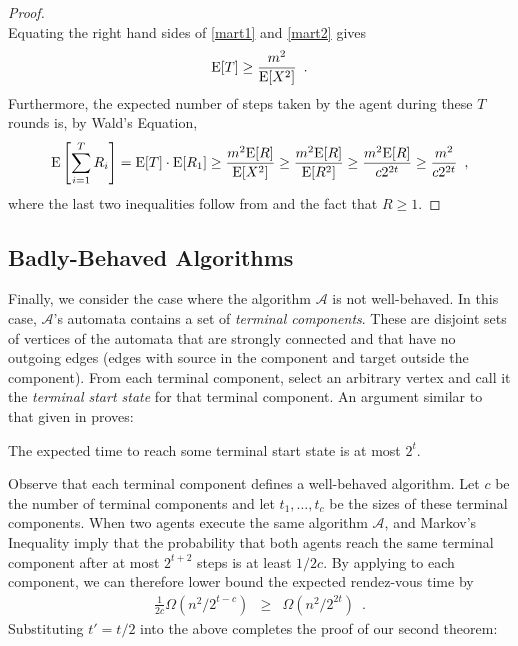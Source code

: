 \documentclass[acmtoalg]{acmtrans2m}
\begin{document}
\begin{proof}
\begin{equation}
\end{equation}
Equating the right hand sides of \eqref{mart1} and \eqref{mart2} gives 
\[
   \mathrm{E}[T] \ge \frac{m^2}{\mathrm{E}[X^2]} \enspace .
\]
Furthermore, the expected number of steps taken by the agent during
these $T$ rounds is, by Wald's Equation, 
\begin{equation}
  \E\left[\sum_{i=1}^T R_i\right] 
    =  \E[T]\cdot\E[R_1] 
    \ge \frac{m^2 \E[R]}{\E[X^2]} 
    \ge \frac{m^2 \E[R]}{\E[R^2]}
    \ge \frac{m^2 \E[R]}{c2^{2t}} 
    \ge \frac{m^2}{c2^{2t}} 
   \enspace ,  \eqlabel{gap}
\end{equation}
where the last two inequalities follow from  and the
fact that $R\ge 1$.
\end{proof}

\subsection{Badly-Behaved Algorithms}

Finally, we consider the case where the algorithm $\mathcal{A}$ is not
well-behaved.  In this case, $\mathcal{A}$'s automata contains a set
of \emph{terminal components}.  These are disjoint sets of vertices of the
automata that are strongly connected and that have no outgoing edges (edges
with source in the component and target outside the component). From each 
terminal component, select an arbitrary vertex and call it
the \emph{terminal start state} for that terminal component.
An argument similar to that given in  proves:

\begin{lem}
The expected time to reach some terminal start state is at most $2^t$.
\end{lem}

Observe that each terminal component defines a well-behaved algorithm.
Let $c$ be the number of terminal components and let $t_1,\ldots,t_c$ be
the sizes of these terminal components.  When two agents execute the same
algorithm $\mathcal{A}$,  and Markov's Inequality
imply that the probability
that both agents reach the same terminal component after at most $2^{t+2}$
steps is at least $1/2c$.  By applying  to each component, we can therefore lower bound the expected rendez-vous time by
\begin{eqnarray*}
  \frac{1}{2c}\Omega(n^2/2^{t-c})
    & \ge & \Omega(n^2/2^{2t}) \enspace .
\end{eqnarray*}
Substituting $t'=t/2$ into the above completes the proof of our second theorem:
\end{document}
